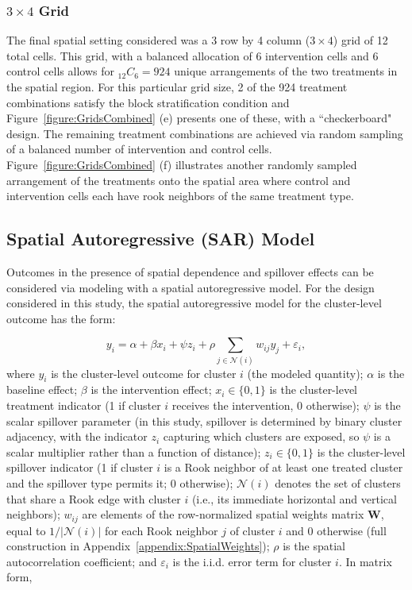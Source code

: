 \documentclass{article}[11pt]
\begin{document}
\subsubsection{$3\times4$ Grid}

The final spatial setting considered was a 3 row by 4 column ($3\times4$) grid of 12 total cells. This grid, with a balanced allocation of 6 intervention cells and 6 control cells allows for %
$_{12}C_{6}=924$ unique arrangements of the two treatments in the spatial region. For this particular grid size, 2 of the 924 treatment combinations satisfy the block stratification condition and Figure~\ref{figure:GridsCombined} (e) presents one of these, with a ``checkerboard" design. The remaining treatment combinations are achieved via random sampling of a balanced number of intervention and control cells. Figure~\ref{figure:GridsCombined} (f) illustrates another randomly sampled arrangement of the treatments onto the spatial area where control and intervention cells each have rook neighbors of the same treatment type.

\subsection{Spatial Autoregressive (SAR) Model}\label{section:SAR}

Outcomes in the presence of spatial dependence and spillover effects can be considered via modeling with a spatial autoregressive model\cite{waller_applied_2004}\cite{fotheringham_sage_2009}\cite{ullah_handbook_1998}. For the design considered in this study, the spatial autoregressive model for the cluster-level outcome has the form:

\begin{equation}\label{Equation:SARmodel}
    y_i = \alpha + \beta x_i + \psi z_i + \rho\sum_{j \in \mathcal{N}(i)} w_{ij} y_j + \varepsilon_i,
\end{equation}
\noindent where $y_i$ is the cluster-level outcome for cluster $i$ (the modeled quantity); $\alpha$ is the baseline effect; $\beta$ is the intervention effect; $x_i \in \{0,1\}$ is the cluster-level treatment indicator (1 if cluster $i$ receives the intervention, 0 otherwise); $\psi$ is the scalar spillover parameter (in this study, spillover is determined by binary cluster adjacency, with the indicator $z_i$ capturing which clusters are exposed, so $\psi$ is a scalar multiplier rather than a function of distance); $z_i \in \{0,1\}$ is the cluster-level spillover indicator (1 if cluster $i$ is a Rook neighbor of at least one treated cluster and the spillover type permits it; 0 otherwise); $\mathcal{N}(i)$ denotes the set of clusters that share a Rook edge with cluster $i$ (i.e., its immediate horizontal and vertical neighbors); $w_{ij}$ are elements of the row-normalized spatial weights matrix $\mathbf{W}$, equal to $1/|\mathcal{N}(i)|$ for each Rook neighbor $j$ of cluster $i$ and 0 otherwise (full construction in Appendix~\ref{appendix:SpatialWeights}); $\rho$ is the spatial autocorrelation coefficient; and $\varepsilon_i$ is the i.i.d. error term for cluster $i$. In matrix form,
\end{document}

